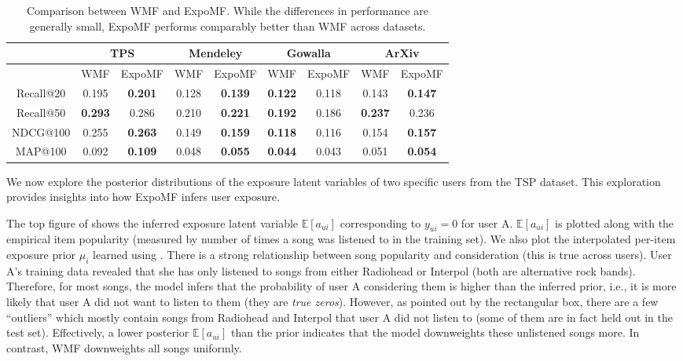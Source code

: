 \begin{table}
\centering
\begin{tabular}{ c  c c  c c  c c  c c  }
   & \multicolumn{2}{c}{\textbf{TPS}} & \multicolumn{2}{c}{\textbf{Mendeley}} & \multicolumn{2}{c}{\textbf{Gowalla}} & \multicolumn{2}{c}{\textbf{ArXiv}} \\ \toprule
    & WMF & ExpoMF	& WMF & ExpoMF 	& WMF& ExpoMF &	 WMF & ExpoMF \\ \midrule
  Recall@20 &  0.195 &  \textbf{0.201}              & 0.128 &  \textbf{0.139}                & \textbf{0.122} & 0.118                          &  0.143 & \textbf{0.147} \\
  Recall@50 &  \textbf{0.293} &  0.286              & 0.210 & \textbf{0.221}                  & \textbf{0.192} & 0.186                         & \textbf{0.237} & 0.236 \\
  NDCG@100  &  0.255 &  \textbf{0.263}              & 0.149 & \textbf{0.159}                 & \textbf{0.118} & 0.116                         & 0.154 & \textbf{0.157} \\
  MAP@100   &  0.092 &  \textbf{0.109}             & 0.048 & \textbf{0.055}                  & \textbf{0.044} & 0.043                         & 0.051 & \textbf{0.054}\\ \bottomrule
\end{tabular}
\caption{Comparison between WMF \citep{hu2008collaborative} and ExpoMF. While
the differences in performance are generally small, ExpoMF performs comparably better than WMF across datasets.}
\label{chpt:expomf:tab:cfresults}
\end{table}


 We now explore the posterior distributions of the exposure latent variables of two specific users from the TSP dataset. This
exploration provides insights into how ExpoMF infers user exposure. 

The top figure of  shows the inferred exposure latent variable
$\mathbb{E}[a_{ui}]$ corresponding to $y_{ui} = 0$ for user A.
$\mathbb{E}[a_{ui}]$ is plotted along with the empirical item popularity
(measured by number of times a song was listened to in the training set).
We also plot the interpolated per-item exposure prior $\mu_i$ 
learned using . There is a strong relationship between song
popularity and consideration (this is true across users). User A's
training data revealed that she has only listened to songs from either
Radiohead or Interpol (both are alternative rock bands). Therefore, for
most songs, the model infers that the probability of user A considering
them is higher than the inferred prior, i.e., it is more likely that user
A did not want to listen to them (they are \emph{true zeros}). However, as
pointed out by the rectangular box, there
are a few ``outliers'' which mostly contain songs from Radiohead and
Interpol that user A did not listen to (some of them are in fact held out
in the test set). Effectively, a lower posterior $\mathbb{E}[a_{ui}]$ than
the prior indicates that the model downweights these unlistened songs
more. In contrast, \gls{WMF} downweights all songs uniformly. 

